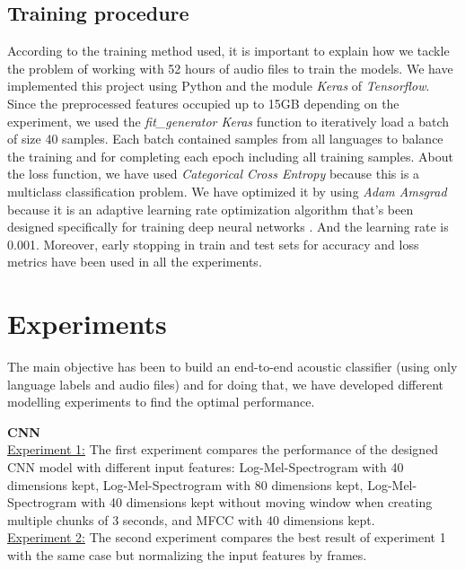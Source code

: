 \documentclass[12pt]{extarticle}
\begin{document}
\subsection{Training procedure}

According to the training method used, it is important to explain how we tackle the problem of working with 52 hours of audio files to train the models. We have implemented this project using Python and the module \textit{Keras} of \textit{Tensorflow}. Since the preprocessed features occupied up to 15GB depending on the experiment, we used the \textit{fit\_generator Keras} function to iteratively load a batch of size 40 samples. Each batch contained samples from all languages to balance the training and for completing each epoch including all training samples. About the loss function, we have used \textit{Categorical Cross Entropy} because this is a multiclass classification problem. We have optimized it by using \textit{Adam Amsgrad} because it is an adaptive learning rate optimization algorithm that’s been designed specifically for training deep neural networks \cite{AdamOptimizer}. And the learning rate is 0.001. Moreover, early stopping in train and test sets for accuracy and loss metrics have been used in all the experiments.

\section{Experiments}

The main objective has been to build an end-to-end acoustic classifier (using only language labels and audio files) and for doing that, we have developed different modelling experiments to find the optimal performance.\\

\newpage

\noindent \textbf{CNN}\\

\noindent \underline{Experiment 1:} The first experiment compares the performance of the designed CNN model with different input features: Log-Mel-Spectrogram with 40 dimensions kept, Log-Mel-Spectrogram with 80 dimensions kept, Log-Mel-Spectrogram with 40 dimensions kept without moving window when creating multiple chunks of 3 seconds, and MFCC with 40 dimensions kept.\\

\noindent \underline{Experiment 2:} The second experiment compares the best result of experiment 1 with the same case but normalizing the input features by frames.\\
\end{document}
